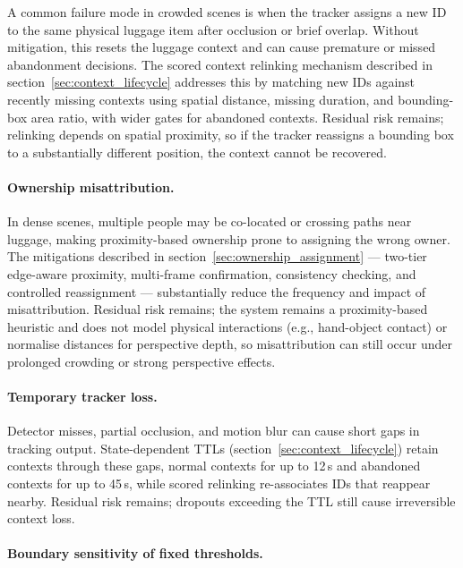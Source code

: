 A common failure mode in crowded scenes is when the tracker assigns a new ID to
the same physical luggage item after occlusion or brief overlap. Without
mitigation, this resets the luggage context and can cause premature or missed
abandonment decisions. The scored context relinking mechanism described in
section~\ref{sec:context_lifecycle} addresses this by matching new IDs against
recently missing contexts using spatial distance, missing duration, and
bounding-box area ratio, with wider gates for abandoned contexts. Residual risk
remains; relinking depends on spatial proximity, so if the tracker reassigns a
bounding box to a substantially different position, the context cannot be
recovered.

\paragraph{Ownership misattribution.}

In dense scenes, multiple people may be co-located or crossing paths near
luggage, making proximity-based ownership prone to assigning the wrong owner.
The mitigations described in section~\ref{sec:ownership_assignment} ---
two-tier edge-aware proximity, multi-frame confirmation, consistency checking,
and controlled reassignment --- substantially reduce the frequency and impact
of misattribution. Residual risk remains; the system remains a proximity-based
heuristic and does not model physical interactions (e.g., hand-object contact)
or normalise distances for perspective depth, so misattribution can still occur
under prolonged crowding or strong perspective effects.

\paragraph{Temporary tracker loss.}

Detector misses, partial occlusion, and motion blur can cause short gaps in
tracking output. State-dependent TTLs (section~\ref{sec:context_lifecycle})
retain contexts through these gaps, normal contexts for up to 12\,s and
abandoned contexts for up to 45\,s, while scored relinking re-associates IDs
that reappear nearby. Residual risk remains; dropouts exceeding the TTL still
cause irreversible context loss.

\paragraph{Boundary sensitivity of fixed thresholds.}

